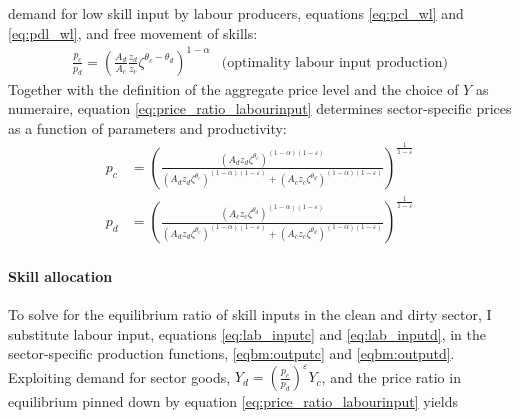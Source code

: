 demand for low skill input by labour producers, equations \ref{eq:pcl_wl} and \ref{eq:pdl_wl}, and free movement of skills: 
\begin{align}\label{eq:price_ratio_labourinput}
	\frac{p_c}{p_d}= \left(\frac{A_d}{A_c}\frac{z_d}{z_c}\zeta^{\theta_c-\theta_d}\right)^{1-\alpha}& \text{(optimality labour input production)}
\end{align}
Together with the definition of the aggregate price level and the choice of $Y$ as numeraire, equation \ref{eq:price_ratio_labourinput} determines sector-specific prices as a function of parameters and productivity:
\begin{align}
	p_c%
	&= \left(\frac{\left(A_dz_d\zeta^{\theta_c}\right)^{(1-\alpha)(1-\varepsilon)}}{\left(A_dz_d\zeta^{\theta_c}\right)^{(1-\alpha)(1-\varepsilon)}+\left(A_cz_c\zeta^{\theta_d}\right)^{(1-\alpha)(1-\varepsilon)}}\right)^{\frac{1}{1-\varepsilon}}\label{eq:eq_pc}\\
	p_d%
	&= \left(\frac{\left(A_cz_c\zeta^{\theta_d}\right)^{(1-\alpha)(1-\varepsilon)}}{\left(A_dz_d\zeta^{\theta_c}\right)^{(1-\alpha)(1-\varepsilon)}+\left(A_cz_c\zeta^{\theta_d}\right)^{(1-\alpha)(1-\varepsilon)}}\right)^{\frac{1}{1-\varepsilon}} \label{eq:eq_pd}
\end{align}

\paragraph{Skill allocation}
To solve for the equilibrium ratio of skill inputs in the clean and dirty sector, I substitute labour input, equations \ref{eq:lab_inputc} and \ref{eq:lab_inputd}, in the sector-specific production functions, \ref{eqbm:outputc} and \ref{eqbm:outputd}. Exploiting demand for sector goods, $Y_d=\left(\frac{p_c}{p_d}\right)^\varepsilon Y_c$, and the price ratio in equilibrium pinned down by equation \ref{eq:price_ratio_labourinput} yields

